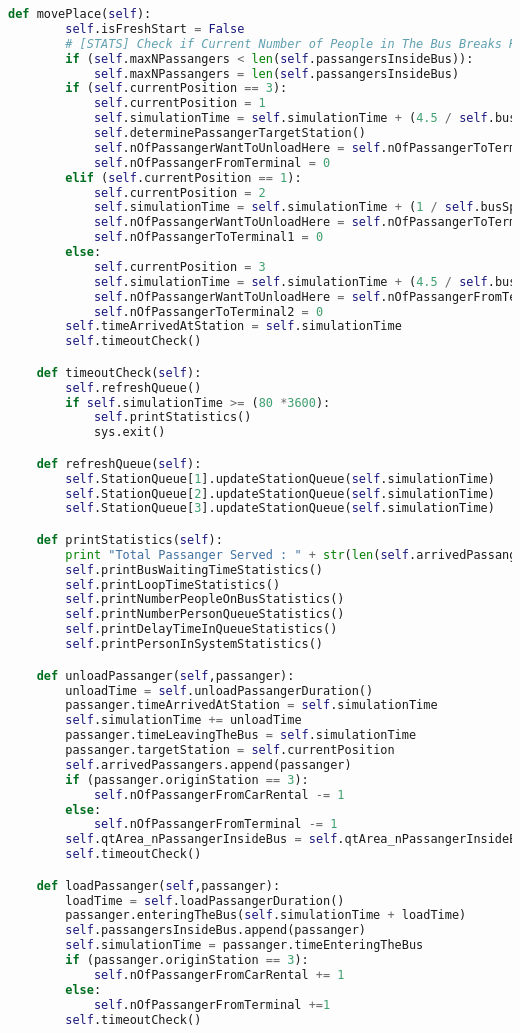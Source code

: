\documentclass{article}
\begin{document}
\begin{lstlisting}[language=Python]
	def movePlace(self):
		self.isFreshStart = False	
		# [STATS] Check if Current Number of People in The Bus Breaks Record
		if (self.maxNPassangers < len(self.passangersInsideBus)):
			self.maxNPassangers = len(self.passangersInsideBus)
		if (self.currentPosition == 3):
			self.currentPosition = 1
			self.simulationTime = self.simulationTime + (4.5 / self.busSpeed * 3600)
			self.determinePassangerTargetStation()
			self.nOfPassangerWantToUnloadHere = self.nOfPassangerToTerminal1
			self.nOfPassangerFromTerminal = 0
		elif (self.currentPosition == 1):
			self.currentPosition = 2
			self.simulationTime = self.simulationTime + (1 / self.busSpeed * 3600)
			self.nOfPassangerWantToUnloadHere = self.nOfPassangerToTerminal2
			self.nOfPassangerToTerminal1 = 0
		else:
			self.currentPosition = 3
			self.simulationTime = self.simulationTime + (4.5 / self.busSpeed * 3600)
			self.nOfPassangerWantToUnloadHere = self.nOfPassangerFromTerminal
			self.nOfPassangerToTerminal2 = 0
		self.timeArrivedAtStation = self.simulationTime
		self.timeoutCheck()

	def timeoutCheck(self):
		self.refreshQueue()
		if self.simulationTime >= (80 *3600):
			self.printStatistics()
			sys.exit()

	def refreshQueue(self):
		self.StationQueue[1].updateStationQueue(self.simulationTime)
		self.StationQueue[2].updateStationQueue(self.simulationTime)
		self.StationQueue[3].updateStationQueue(self.simulationTime)

	def printStatistics(self):
		print "Total Passanger Served : " + str(len(self.arrivedPassangers))
		self.printBusWaitingTimeStatistics()
		self.printLoopTimeStatistics()
		self.printNumberPeopleOnBusStatistics()					
		self.printNumberPersonQueueStatistics()
		self.printDelayTimeInQueueStatistics()
		self.printPersonInSystemStatistics()

	def unloadPassanger(self,passanger):
		unloadTime = self.unloadPassangerDuration()
		passanger.timeArrivedAtStation = self.simulationTime
		self.simulationTime += unloadTime
		passanger.timeLeavingTheBus = self.simulationTime
		passanger.targetStation = self.currentPosition
		self.arrivedPassangers.append(passanger)	
		if (passanger.originStation == 3):
			self.nOfPassangerFromCarRental -= 1
		else:
			self.nOfPassangerFromTerminal -= 1
		self.qtArea_nPassangerInsideBus = self.qtArea_nPassangerInsideBus + (self.simulationTime - passanger.timeEnteringTheBus)
		self.timeoutCheck()

	def loadPassanger(self,passanger):
		loadTime = self.loadPassangerDuration()
		passanger.enteringTheBus(self.simulationTime + loadTime)
		self.passangersInsideBus.append(passanger)
		self.simulationTime = passanger.timeEnteringTheBus
		if (passanger.originStation == 3):
			self.nOfPassangerFromCarRental += 1
		else:
			self.nOfPassangerFromTerminal +=1
		self.timeoutCheck()


\end{lstlisting}
\end{document}

